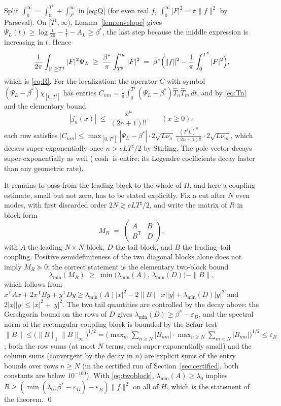 ﻿\documentclass[11pt]{article}
\newcommand{\lammin}{\lambda_{\min}}
\newcommand{\Tsharp}{T^{\sharp}}
\begin{document}
Split $\int_0^\infty=\int_0^{\Tsharp}+\int_{\Tsharp}^\infty$ in
\eqref{eq:Q} (for even real $f$, $\int_0^\infty|F|^2=\pi\|f\|^2$ by
Parseval).  On $[\Tsharp,\infty)$,
Lemma~\ref{lem:envelope} gives
$\Psi_L(t)\ge\log\frac t{2\pi}-\frac1t-A_L\ge\beta^*$, the last step
because the middle expression is increasing in $t$.  Hence
\[
\frac1{2\pi}\int_{|t|\ge \Tsharp}|F|^2\Psi_L
\;\ge\;\frac{\beta^*}\pi\int_{\Tsharp}^\infty|F|^2
\;=\;\beta^*\Bigl(\|f\|^2-\frac1\pi\int_0^{\Tsharp}|F|^2\Bigr),
\]
which is \eqref{eq:R}.  For the localization: the operator $C$ with
symbol $(\Psi_L-\beta^*)\chi_{[0,\Tsharp]}$ has entries
$C_{nm}=\frac1\pi\int_0^{\Tsharp}(\Psi_L-\beta^*)\widehat T_n
\widehat T_m\,dt$, and by \eqref{eq:Tn} and the elementary bound
\begin{equation}\label{eq:forbidden}
|j_n(x)|\;\le\;\frac{x^n}{(2n+1)!!}\qquad(x\ge0),
\end{equation}
each row satisfies
$|C_{nm}|\le\max_{[0,\Tsharp]}|\Psi_L-\beta^*|\cdot
2\sqrt{L\nu_n}\,\frac{(\Tsharp L)^n}{(2n+1)!!}\cdot2\sqrt{L\nu_m}$,
which decays super-exponentially once $n>eL\Tsharp/2$ by Stirling.
The pole vector decays super-exponentially as well ($\cosh$ is entire:
its Legendre coefficients decay faster than any geometric rate).

It remains to pass from the leading block to the whole of $H$, and here
a coupling estimate, small but not zero, has to be stated explicitly.
Fix a cut after $N$ even modes, with first discarded order
$2N\gtrsim eL\Tsharp/2$, and write the matrix of $R$ in block form
\[
M_R\;=\;\begin{pmatrix}A&B\\ B^{\mathsf T}&D\end{pmatrix},
\]
with $A$ the leading $N\times N$ block, $D$ the tail block, and $B$
the leading--tail coupling.  Positive semidefiniteness of the two
diagonal blocks alone does not imply $M_R\succeq0$; the correct
statement is the elementary two-block bound
\begin{equation}\label{eq:twoblock}
\lammin(M_R)\;\ge\;\min\bigl(\lammin(A),\,\lammin(D)\bigr)
-\|B\| ,
\end{equation}
which follows from
$x^{\mathsf T}Ax+2x^{\mathsf T}By+y^{\mathsf T}Dy
\ge\lammin(A)|x|^2-2\|B\||x||y|+\lammin(D)|y|^2$ and
$2|x||y|\le|x|^2+|y|^2$.  The two tail quantities are controlled by
the decay above: the Gershgorin bound on the rows of $D$ gives
$\lammin(D)\ge\beta^*-\varepsilon_D$, and the spectral norm of the
rectangular coupling block is bounded by the Schur test
$\|B\|\le\bigl(\|B\|_1\|B\|_\infty\bigr)^{1/2}
=\bigl(\max_m\textstyle\sum_{n\ge N}|B_{nm}|
\cdot\max_{n\ge N}\sum_{m<N}|B_{nm}|\bigr)^{1/2}
\le\varepsilon_B$; both the row sums (at most $N$ terms, each
super-exponentially small) and the column sums (convergent by the
decay in $n$) are explicit sums of the entry bounds over rows
$n\ge N$ (in the certified run of Section~\ref{sec:certified}, both
constants are below $10^{-100}$).  With
\eqref{eq:twoblock}, $\lammin(A)\ge\lambda_0$ implies
$R\ge(\min(\lambda_0,\beta^*-\varepsilon_D)-\varepsilon_B)\|f\|^2$ on
all of $H$, which is the statement of the theorem.  \qed
\end{document}
